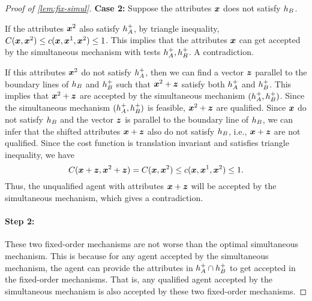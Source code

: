 \begin{proof}[Proof of \cref{lem:fix-simul}]
    \textbf{Case 2:} Suppose the attributes $\boldsymbol{x}$ does not satisfy $h_B$. 

    If the attributes $\boldsymbol{x}^2$ also satisfy $h_A^+$, by triangle inequality, $C(\boldsymbol{x},\boldsymbol{x}^2) \leq c(\boldsymbol{x},\boldsymbol{x}^1,\boldsymbol{x}^2) \leq 1$.
    This implies that the attributes $\boldsymbol{x}$ can get accepted by the simultaneous mechanism with tests $h_A^{+},h_B^{+}$. 
    A contradiction.
    
    If this attributes $\boldsymbol{x}^2$ do not satisfy $h_A^+$, then we can find a vector $\boldsymbol{z}$ parallel to the boundary lines of $h_B$ and $h_B^+$ such that $\boldsymbol{x}^2 + \boldsymbol{z}$ satisfy both $h_A^+$ and $ h_B^+$. 
This implies that $\boldsymbol{x}^2 + \boldsymbol{z}$ are accepted by the simultaneous mechanism $(h_A^{+},h_B^{+})$.
    Since the simultaneous mechanism $(h_A^{+},h_B^{+})$ is feasible, $\boldsymbol{x}^2 + \boldsymbol{z}$ are qualified.
    Since $\boldsymbol{x}$ do not satisfy $h_B$ and the vector $\boldsymbol{z}$ is parallel to the boundary line of $h_B$, we can infer that the shifted attributes $\boldsymbol{x} + \boldsymbol{z}$ also do not satisfy $h_B$, i.e.,  $\boldsymbol{x} + \boldsymbol{z}$ are not qualified. 
    Since the cost function is translation invariant and satisfies triangle inequality, we have 
    $$
    C(\boldsymbol{x}+\boldsymbol{z}, \boldsymbol{x}^2+\boldsymbol{z}) = C(\boldsymbol{x}, \boldsymbol{x}^2) \leq c(\boldsymbol{x}, \boldsymbol{x}^1, \boldsymbol{x}^2) \leq 1.
    $$
    Thus, the unqualified agent with attributes $\boldsymbol{x}+\boldsymbol{z}$ will be accepted by the simultaneous mechanism, which gives a contradiction. 

    


\paragraph{Step 2:}
    These two fixed-order mechanisms are not worse than the optimal simultaneous mechanism. 
    This is because for any agent accepted by the simultaneous mechanism, the agent can provide the attributes in $h_A^{+}\cap h_B^{+}$ to get accepted in the fixed-order mechanisms.
    That is, any qualified agent accepted by the simultaneous mechanism is also accepted by these two fixed-order mechanisms.
\end{proof}

